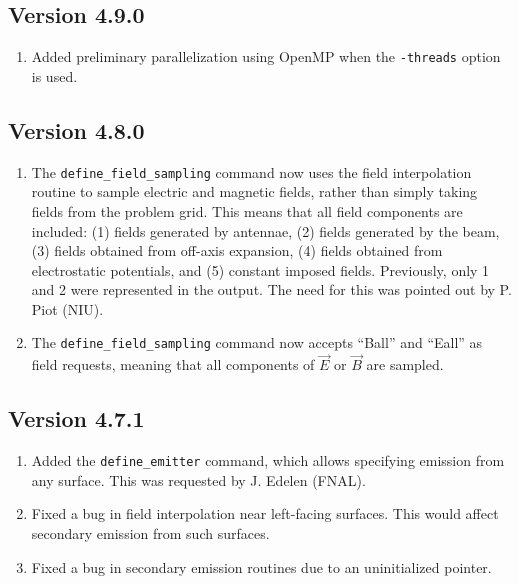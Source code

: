 \documentclass[11pt]{article}
\begin{document}
\subsection{Version 4.9.0}
\begin{enumerate}
\item Added preliminary parallelization using OpenMP when the \verb|-threads| option is used.
\end{enumerate}

\subsection{Version 4.8.0}

\begin{enumerate}
\item The \verb|define_field_sampling| command now uses the field interpolation routine to sample
  electric and magnetic fields, rather than simply taking fields from the problem grid. This means that
  all field components are included: (1) fields generated by antennae, (2) fields generated by the beam,
  (3) fields obtained from off-axis expansion, (4) fields obtained from electrostatic potentials, and (5) constant
  imposed fields. Previously, only 1 and 2 were represented in the output.
  The need for this was pointed out by P. Piot (NIU).
\item The \verb|define_field_sampling| command now accepts ``Ball'' and ``Eall'' as field requests, meaning
  that all components of $\vec{E}$ or $\vec{B}$ are sampled.
\end{enumerate}


\subsection{Version 4.7.1}
\begin{enumerate}
\item Added the \verb|define_emitter| command, which allows specifying emission from any
  surface. This was requested by J. Edelen (FNAL).
\item Fixed a bug in field interpolation near left-facing surfaces. This would affect secondary emission from such surfaces.
\item Fixed a bug in secondary emission routines due to an uninitialized pointer.
\end{enumerate}
\end{document}
